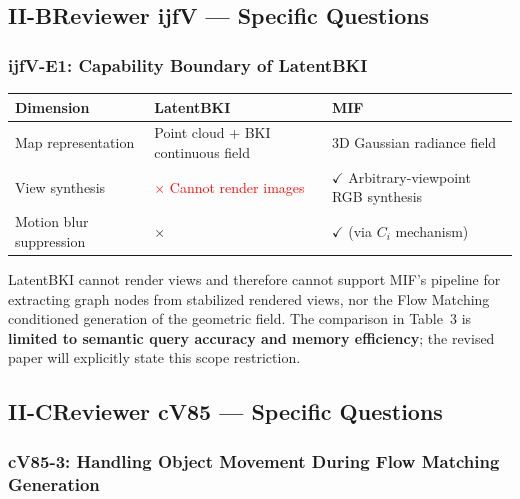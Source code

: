 \documentclass[10pt,a4paper]{article}
\begin{document}
\subsection*{II-B\enspace Reviewer ijfV --- Specific Questions}

\subsubsection*{ijfV-E1: Capability Boundary of LatentBKI}

\begin{table}[h]
\centering\small
\begin{tabular}{L{2.8cm}L{3.8cm}L{5cm}}
\toprule
\textbf{Dimension} & \textbf{LatentBKI} & \textbf{MIF}\\
\midrule
Map representation & Point cloud + BKI continuous field & 3D Gaussian radiance field\\
View synthesis & \textcolor{red}{$\times$ Cannot render images} & \textcolor{green!60!black}{$\checkmark$ Arbitrary-viewpoint RGB synthesis}\\
Motion blur suppression & $\times$ & $\checkmark$ (via $C_i$ mechanism)\\
\bottomrule
\end{tabular}
\end{table}

LatentBKI cannot render views and therefore cannot support MIF's pipeline for extracting graph nodes from stabilized rendered views, nor the Flow Matching conditioned generation of the geometric field. The comparison in Table~3 is \textbf{limited to semantic query accuracy and memory efficiency}; the revised paper will explicitly state this scope restriction.

\subsection*{II-C\enspace Reviewer cV85 --- Specific Questions}

\subsubsection*{cV85-3: Handling Object Movement During Flow Matching Generation}
\end{document}
